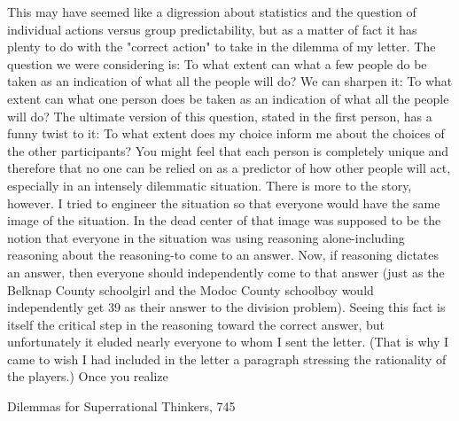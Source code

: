         This may have seemed like a digression about statistics and the question of
individual actions versus group predictability, but as a matter of fact it has plenty to
do with the "correct action" to take in the dilemma of my letter. The question we were
considering is: To what extent can what a few people do be taken as an indication of
what all the people will do? We can sharpen it: To what extent can what one person
does be taken as an indication of what all the people will do? The ultimate version of
this question, stated in the first person, has a funny twist to it: To what extent does my
choice inform me about the choices of the other participants?
        You might feel that each person is completely unique and therefore that no one
can be relied on as a predictor of how other people will act, especially in an intensely
dilemmatic situation. There is more to the story, however. I tried to engineer the
situation so that everyone would have the same image of the situation. In the dead
center of that image was supposed to be the notion that everyone in the situation was
using reasoning alone-including reasoning about the reasoning-to come to an answer.
        Now, if reasoning dictates an answer, then everyone should independently
come to that answer (just as the Belknap County schoolgirl and the Modoc County
schoolboy would independently get 39 as their answer to the division problem).
Seeing this fact is itself the critical step in the reasoning toward the correct answer,
but unfortunately it eluded nearly everyone to whom I sent the letter. (That is why I
came to wish I had included in the letter a paragraph stressing the rationality of the
players.) Once you realize




Dilemmas for Superrational Thinkers,                                                  745

